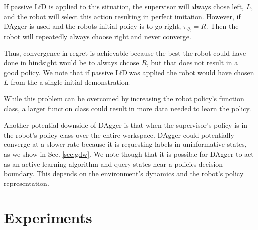 \documentclass[10pt, conference]{ieeeconf}      %
\begin{document}
If passive LfD is applied to this situation, the supervisor will always chose left, $L$, and the robot will select this action resulting in perfect imitation. However, if DAgger is used and the robots initial policy is to go right, $\pi_{\theta_0} = R$. Then the robot will repeatedly always choose right and never converge. 

Thus, convergence in regret is achievable because the best the robot could have done in hindsight would be to always choose $R$, but that does not result in a good policy. We note that if passive LfD was applied the robot would have chosen $L$ from the a single initial demonstration. 

 While this problem can be overcomed by increasing the robot policy's function class, a larger function class could result in more data needed to learn the policy\cite{kakade2009generalization}.
 
Another potential downside of DAgger is that when the supervisor's policy is in the robot's policy class over the entire workspace. DAgger could potentially converge at a slower rate because it is requesting labels in uninformative states, as we show in Sec. \ref{sec:gdw}. We note though that it is possible for DAgger to act as an active learning algorithm and query states near a policies decision boundary. This depends on the environment's dynamics and the robot's policy representation. 





\section{Experiments}
\end{document}
